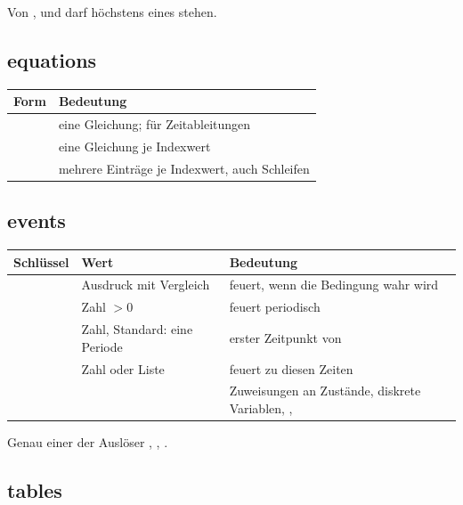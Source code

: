 Von ,  und  darf höchstens eines
stehen.

\subsection*{equations}

\begin{longtable}{@{}P{6.0cm}P{7.8cm}@{}}
  \toprule
  Form & Bedeutung \\
  \midrule
  \endhead
  \bottomrule
  \endfoot
   & eine Gleichung;  für Zeitableitungen \\
   & eine Gleichung je Indexwert \\
   & mehrere Einträge je Indexwert, auch Schleifen \\
\end{longtable}

\subsection*{events}

\begin{longtable}{@{}P{3.0cm}P{4.3cm}P{6.5cm}@{}}
  \toprule
  Schlüssel & Wert & Bedeutung \\
  \midrule
  \endhead
  \bottomrule
  \endfoot
   & Ausdruck mit Vergleich & feuert, wenn die Bedingung wahr wird \\
   & Zahl $>0$ & feuert periodisch \\
   & Zahl, Standard: eine Periode & erster Zeitpunkt von  \\
   & Zahl oder Liste & feuert zu diesen Zeiten \\
   &  & Zuweisungen an Zustände, diskrete Variablen, ,  \\
\end{longtable}

Genau einer der Auslöser , , .

\subsection*{tables}
\label{sec:ref-tabellen}

